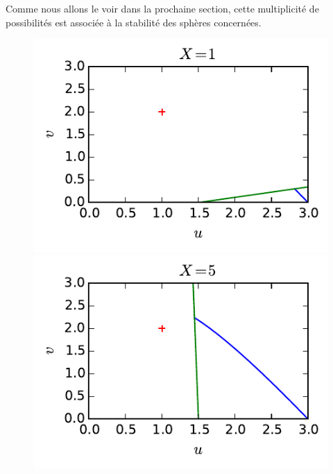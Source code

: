 Comme nous allons le voir dans la prochaine section, cette multiplicité de possibilités est associée à la stabilité des sphères concernées.

	\begin{figure}[h!]
		\begin{minipage}[b]{0.40\linewidth}
			\centering \includegraphics{graphe/milne_X1.pdf}
		\end{minipage}\hfill
		\begin{minipage}[b]{0.48\linewidth}
			\centering \includegraphics{graphe/milne_X5.pdf}
		\end{minipage}
		\begin{minipage}[b]{0.40\linewidth}

\end{minipage}
\end{figure}
